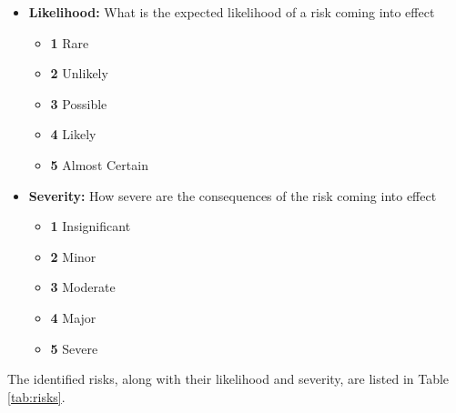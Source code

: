 \begin{itemize}
    \item \textbf{Likelihood:} What is the expected likelihood of a risk coming into effect
    \begin{itemize}
        \item \textbf{1} Rare
        \item \textbf{2} Unlikely
        \item \textbf{3} Possible
        \item \textbf{4} Likely
        \item \textbf{5} Almost Certain
    \end{itemize}

    \item \textbf{Severity:} How severe are the consequences of the risk coming into effect
    \begin{itemize}
        \item \textbf{1} Insignificant
        \item \textbf{2} Minor
        \item \textbf{3} Moderate
        \item \textbf{4} Major
        \item \textbf{5} Severe
    \end{itemize}
\end{itemize}



The identified  risks, along with their likelihood and severity, are listed in Table \ref{tab:risks}.

